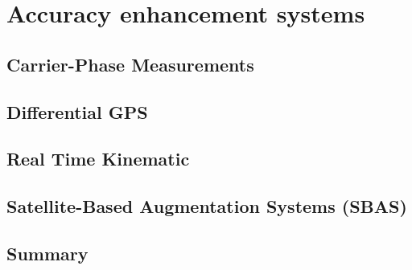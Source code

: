 \chapter{Accuracy enhancement systems}

\section{Carrier-Phase Measurements}

\section{Differential GPS}

\section{Real Time Kinematic}

\section{Satellite-Based Augmentation Systems (SBAS)}

\section{Summary}